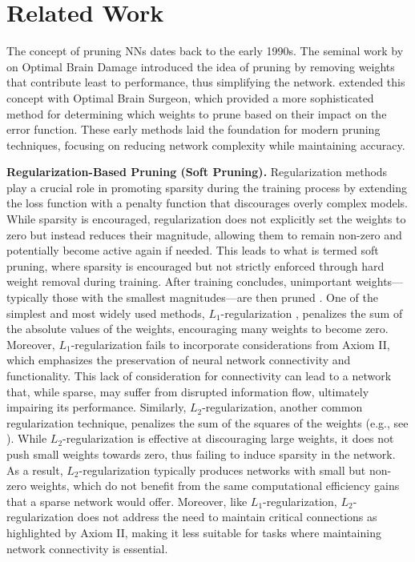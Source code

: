 \section{Related Work}
The concept of pruning NNs dates back to the early 1990s. The seminal work by \citet{lecun1989optimal} on Optimal Brain Damage introduced the idea of pruning by removing weights that contribute least to performance, thus simplifying the network. \citet{hassibi1993optimal} extended this concept with Optimal Brain Surgeon, which provided a more sophisticated method for determining which weights to prune based on their impact on the error function. These early methods laid the foundation for modern pruning techniques, focusing on reducing network complexity while maintaining accuracy.



\textbf{Regularization-Based Pruning (Soft Pruning).} 
Regularization methods play a crucial role in promoting sparsity during the training process by extending the loss function with a penalty function that discourages overly complex models.
While sparsity is encouraged, regularization does not explicitly set the weights to zero but instead reduces their magnitude, allowing them to remain non-zero and potentially become active again if needed.
This leads to what is termed soft pruning, where sparsity is encouraged but not strictly enforced through hard weight removal during training. After training concludes, unimportant weights—typically those with the smallest magnitudes—are then pruned \cite{hagiwara1993removal, gale2019state}.
One of the simplest and most widely used methods, $L_1$-regularization \citep{tibshirani1996regression, he2017channel, yang2019structured, de2022neural, ziyin2023spred}, penalizes the sum of the absolute values of the weights, encouraging many weights to become zero. Moreover, $L_1$-regularization fails to incorporate considerations from Axiom II, which emphasizes the preservation of neural network connectivity and functionality. This lack of consideration for connectivity can lead to a network that, while sparse, may suffer from disrupted information flow, ultimately impairing its performance.
Similarly, $L_2$-regularization, another common regularization technique, penalizes the sum of the squares of the weights (e.g., see \citet{hinton2012practical, phaisangittisagul2016analysis, loshchilov2017fixing}). 
While $L_2$-regularization is effective at discouraging large weights, it does not push small weights towards zero, thus failing to induce sparsity in the network. As a result, $L_2$-regularization typically produces networks with small but non-zero weights, which do not benefit from the same computational efficiency gains that a sparse network would offer. Moreover, like $L_1$-regularization, $L_2$-regularization does not address the need to maintain critical connections as highlighted by Axiom II, making it less suitable for tasks where maintaining network connectivity is essential.

